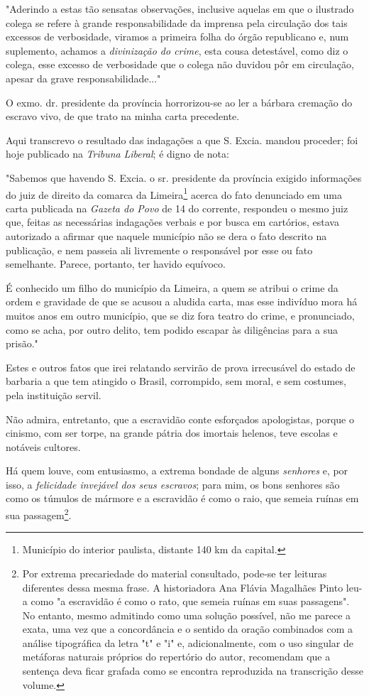 "Aderindo a estas tão sensatas observações, inclusive aquelas em que o
ilustrado colega se refere à grande responsabilidade da imprensa pela
circulação dos tais excessos de verbosidade, viramos a primeira folha do
órgão republicano e, num suplemento, achamos a \emph{divinização do
crime}, esta cousa detestável, como diz o colega, esse excesso de
verbosidade que o colega não duvidou pôr em circulação, apesar da grave
responsabilidade..."

O exmo. dr. presidente da província horrorizou-se ao ler a bárbara
cremação do escravo vivo, de que trato na minha carta precedente.

Aqui transcrevo o resultado das indagações a que S. Excia. mandou
proceder; foi hoje publicado na \emph{Tribuna} \emph{Liberal}; é digno
de nota:

"Sabemos que havendo S. Excia. o sr. presidente da província exigido
informações do juiz de direito da comarca da Limeira\footnote{
  Município do interior paulista, distante 140 km da capital.} acerca do
fato denunciado em uma carta publicada na \emph{Gazeta do Povo} de 14 do
corrente, respondeu o mesmo juiz que, feitas as necessárias indagações
verbais e por busca em cartórios, estava autorizado a afirmar que
naquele município não se dera o fato descrito na publicação, e nem
passeia ali livremente o responsável por esse ou fato semelhante.
Parece, portanto, ter havido equívoco.

É conhecido um filho do município da Limeira, a quem se atribui o crime
da ordem e gravidade de que se acusou a aludida carta, mas esse
indivíduo mora há muitos anos em outro município, que se diz fora teatro
do crime, e pronunciado, como se acha, por outro delito, tem podido
escapar às diligências para a sua prisão."

Estes e outros fatos que irei relatando servirão de prova irrecusável do
estado de barbaria a que tem atingido o Brasil, corrompido, sem moral, e
sem costumes, pela instituição servil.

Não admira, entretanto, que a escravidão conte esforçados apologistas,
porque o cinismo, com ser torpe, na grande pátria dos imortais helenos,
teve escolas e notáveis cultores.

Há quem louve, com entusiasmo, a extrema bondade de alguns
\emph{senhores} e, por isso, a \emph{felicidade invejável dos seus
escravos}; para mim, os bons senhores são como os túmulos de mármore e a
escravidão é como o raio, que semeia ruínas em sua passagem\footnote{
  Por extrema precariedade do material consultado, pode-se ter leituras
  diferentes dessa mesma frase. A historiadora Ana Flávia Magalhães
  Pinto leu-a como "a escravidão é como o rato, que semeia ruínas em
  suas passagens". No entanto, mesmo admitindo como uma solução
  possível, não me parece a exata, uma vez que a concordância e o
  sentido da oração combinados com a análise tipográfica da letra "t" e
  "i" e, adicionalmente, com o uso singular de metáforas naturais
  próprios do repertório do autor, recomendam que a sentença deva ficar
  grafada como se encontra reproduzida na transcrição desse volume.}.

